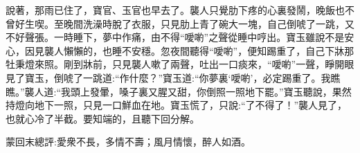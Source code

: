 \begin{parag}
    說著，那雨已住了，寶官、玉官也早去了。襲人只覺肋下疼的心裏發鬧，晚飯也不曾好生喫。至晚間洗澡時脫了衣服，只見肋上青了碗大一塊，自己倒唬了一跳，又不好聲張。一時睡下，夢中作痛，由不得“噯喲”之聲從睡中哼出。寶玉雖說不是安心，因見襲人懶懶的，也睡不安穩。忽夜間聽得“噯喲”，便知踢重了，自己下牀那牡秉燈來照。剛到牀前，只見襲人嗽了兩聲，吐出一口痰來，“噯喲”一聲，睜開眼見了寶玉，倒唬了一跳道:“作什麼？”寶玉道:“你夢裏‘噯喲’，必定踢重了。我瞧瞧。”襲人道:“我頭上發暈，嗓子裏又腥又甜，你倒照一照地下罷。”寶玉聽說，果然持燈向地下一照，只見一口鮮血在地。寶玉慌了，只說:“了不得了！”襲人見了，也就心冷了半截。要知端的，且聽下回分解。
\end{parag}


\begin{parag}
    \begin{note}蒙回末總評:愛衆不長，多情不壽；風月情懷，醉人如酒。\end{note}
\end{parag}
